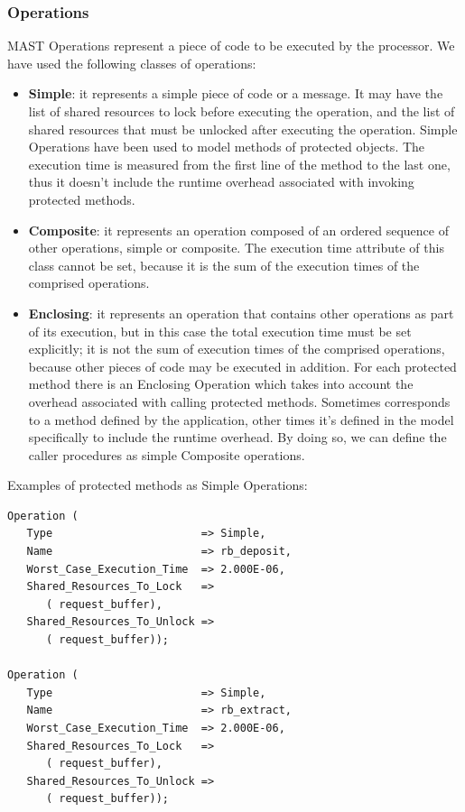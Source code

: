 \documentclass{article}
\begin{document}
\subsubsection{Operations}

MAST Operations represent a piece of code to be executed by the processor. We have used the following classes of operations:

\begin{itemize}
   \item \textbf{Simple}: it represents a simple piece of code or a message. It may have the list of shared resources to lock before executing the operation, and the list of shared resources that must be unlocked after executing the operation. Simple Operations have been used to model methods of protected objects. The execution time is measured from the first line of the method to the last one, thus it doesn't include the runtime overhead associated with invoking protected methods.
   \item \textbf{Composite}: it represents an operation composed of an ordered sequence of other operations, simple or composite. The execution time attribute of this class cannot be set, because it is the sum of the execution times of the comprised operations.
   \item \textbf{Enclosing}: it represents an operation that contains other operations as part of its execution, but in this case the total execution time must be set explicitly; it is not the sum of execution times of the comprised operations, because other pieces of code may be executed in addition. For each protected method there is an Enclosing Operation which takes into account the overhead associated with calling protected methods. Sometimes corresponds to a method defined by the application, other times it's defined in the model specifically to include the runtime overhead. By doing so, we can define the caller procedures as simple Composite operations.
\end{itemize}

Examples of protected methods as Simple Operations:

\begin{lstlisting}
Operation (
   Type                       => Simple,
   Name                       => rb_deposit,
   Worst_Case_Execution_Time  => 2.000E-06,
   Shared_Resources_To_Lock   =>
      ( request_buffer),
   Shared_Resources_To_Unlock =>
      ( request_buffer));

Operation (
   Type                       => Simple,
   Name                       => rb_extract,
   Worst_Case_Execution_Time  => 2.000E-06,
   Shared_Resources_To_Lock   =>
      ( request_buffer),
   Shared_Resources_To_Unlock =>
      ( request_buffer));
\end{lstlisting}
\end{document}
